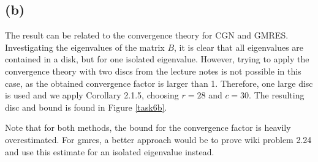 \subsection*{(b)}
The result can be related to the convergence theory for CGN and GMRES. Investigating the eigenvalues of the matrix $B$, it is clear that all eigenvalues are contained in a disk, but for one isolated eigenvalue. However, trying to apply the convergence theory with two discs from the lecture notes is not possible in this case, as the obtained convergence factor is larger than 1. Therefore, one large disc is used and we apply Corollary 2.1.5, choosing $r = 28$ and $c =30 $. The resulting disc and bound is found in Figure \ref{task6b}.

Note that for both methods, the bound for the convergence factor is heavily overestimated. For gmres, a better approach would be to prove wiki problem 2.24 and use this estimate for an isolated eigenvalue instead.

